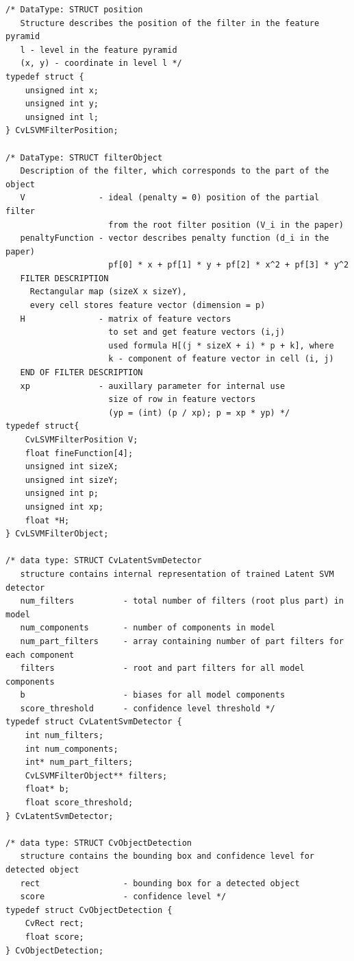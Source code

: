 \begin{lstlisting}
/* DataType: STRUCT position
   Structure describes the position of the filter in the feature pyramid
   l - level in the feature pyramid
   (x, y) - coordinate in level l */
typedef struct {
    unsigned int x;
    unsigned int y;
    unsigned int l;
} CvLSVMFilterPosition;

/* DataType: STRUCT filterObject
   Description of the filter, which corresponds to the part of the object
   V               - ideal (penalty = 0) position of the partial filter
                     from the root filter position (V_i in the paper)
   penaltyFunction - vector describes penalty function (d_i in the paper)
                     pf[0] * x + pf[1] * y + pf[2] * x^2 + pf[3] * y^2
   FILTER DESCRIPTION
     Rectangular map (sizeX x sizeY),
     every cell stores feature vector (dimension = p)
   H               - matrix of feature vectors
                     to set and get feature vectors (i,j)
                     used formula H[(j * sizeX + i) * p + k], where
                     k - component of feature vector in cell (i, j)
   END OF FILTER DESCRIPTION
   xp              - auxillary parameter for internal use
                     size of row in feature vectors
                     (yp = (int) (p / xp); p = xp * yp) */
typedef struct{
    CvLSVMFilterPosition V;
    float fineFunction[4];
    unsigned int sizeX;
    unsigned int sizeY;
    unsigned int p;
    unsigned int xp;
    float *H;
} CvLSVMFilterObject;

/* data type: STRUCT CvLatentSvmDetector
   structure contains internal representation of trained Latent SVM detector
   num_filters          - total number of filters (root plus part) in model
   num_components       - number of components in model
   num_part_filters     - array containing number of part filters for each component
   filters              - root and part filters for all model components
   b                    - biases for all model components
   score_threshold      - confidence level threshold */
typedef struct CvLatentSvmDetector {
    int num_filters;
    int num_components;
    int* num_part_filters;
    CvLSVMFilterObject** filters;
    float* b;
    float score_threshold;
} CvLatentSvmDetector;

/* data type: STRUCT CvObjectDetection
   structure contains the bounding box and confidence level for detected object
   rect                 - bounding box for a detected object
   score                - confidence level */
typedef struct CvObjectDetection {
    CvRect rect;
    float score;
} CvObjectDetection;

\end{lstlisting}

